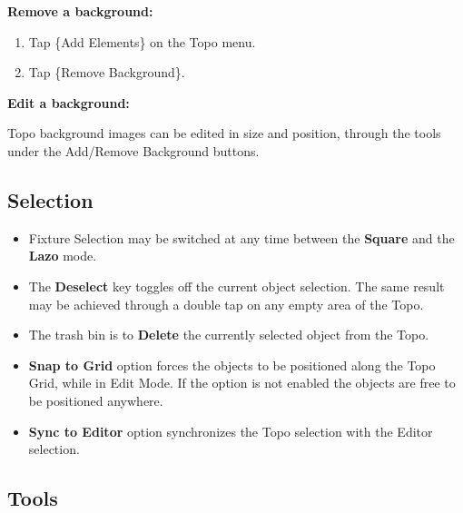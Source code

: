 \documentclass[
]{article}
\begin{document}
\textbf{Remove a background:}

\begin{enumerate}
\def\labelenumi{\arabic{enumi}.}
\item
  Tap \{Add Elements\} on the Topo menu.
\item
  Tap \{Remove Background\}.
\end{enumerate}

\textbf{Edit a background:}

Topo background images can be edited in size and position, through the tools under the Add/Remove Background buttons.

\hypertarget{Selection-15.4}{%
\subsection{Selection}\label{Selection-15.4}}

\begin{itemize}
\item
  Fixture Selection may be switched at any time between the \textbf{Square} and the \textbf{Lazo} mode.
\item
  The \textbf{Deselect} key toggles off the current object selection. The same result may be achieved through a double tap on any empty area of the Topo.
\item
  The trash bin is to \textbf{Delete} the currently selected object from the Topo.
\item
  \textbf{Snap to Grid} option forces the objects to be positioned along the Topo Grid, while in Edit Mode. If the option is not enabled the objects are free to be positioned anywhere.
\item
  \textbf{Sync to Editor} option synchronizes the Topo selection with the Editor selection.
\end{itemize}

\hypertarget{Add-Elements-15.5}{%
\subsection{Tools}\label{Add-Elements-15.5}}
\end{document}
